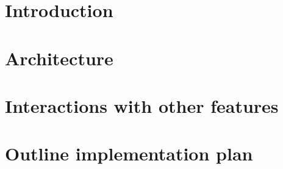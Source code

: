 



\maketitle

\tableofcontents

\chapter{Introduction}


\chapter{Architecture}













\chapter{Interactions with other features}



\chapter{Outline implementation plan}



\printbibliography[heading=bibintoc]

\appendix





